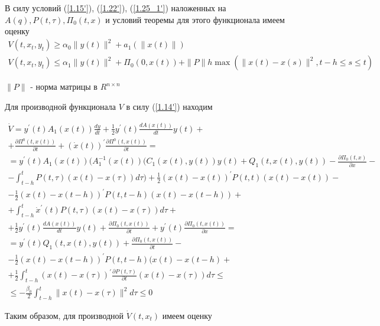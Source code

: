 В силу условий (\ref{1.15'}), (\ref{1.22'}), (\ref{1.25_1'}) наложенных на $A(q), P(t, \tau), \Pi_0(t, x)$ и условий теоремы для этого функционала имеем оценку
$$
\begin{array}{c}
	V(t, x_t, y_t) \ge \alpha_0 \| y(t) \|^2 + a_1 (\| x(t) \|)\\
	V(t, x_t, y_t) \le \alpha_1 \| y(t) \|^2 + \Pi_0 (0, x(t)) + \| P \| h \max (\| x(t) - x(s) \|^2, t-h \le s \le t)
\end{array}
$$

$\| P \|$ - норма матрицы в $R^{n \times n}$

Для производной функционала $V$ в силу (\ref{1.14'}) находим

$$
\begin{array}{c}
\displaystyle \dot V = y^{'} (t) A_1 (x(t)) \frac{dy}{dt} + \frac12 y^{'} (t) \frac{d A(x(t))}{dt} y(t) +\\+
\displaystyle \frac{\partial \Pi^0 (t, x(t))}{\partial t} + (\dot x (t))^{'} \frac{\partial \Pi^0 (t, x(t))}{\partial t} =\\
\displaystyle = y^{'} (t) A_1 (x(t)) ( A_1^{-1} (x(t)) (C_1 (x(t), y(t)) y(t) + Q_1 (t, x(t), y(t)) - \frac{\partial \Pi_0 (t, x)}{\partial x} -\\
\displaystyle - \int_{t - h}^{t} P(t, \tau) (x(t) - x(\tau)) d \tau) + \frac12 (x(t) - x(t))^{'} P(t, t) (x(t) - x(t)) -\\
\displaystyle - \frac12 (x(t) - x(t - h))^{'} P(t, t - h) (x(t) - x(t - h)) +\\
\displaystyle + \int_{t - h}^{t} \dot x^{'} (t) P(t, \tau) (x(t) - x(\tau)) d \tau +\\
\displaystyle + \frac12 y^{'}(t) \frac{d A(x(t))}{dt} y(t) + \frac{\partial \Pi_0 (t, x(t))}{\partial t} + y^{'}(t) \frac{\partial \Pi_0 (t, x(t))}{\partial x} =\\
\displaystyle = y^{'} (t) Q_1 (t, x(t), y(t)) + \frac{\partial \Pi_0 (t, x(t))}{\partial t} -\\
\displaystyle - \frac12 (x(t) - x(t - h))^{'} P (t, t - h) (x(t) - x(t - h) +\\
\displaystyle + \frac12 \int_{t - h}^{t} (x(t) - x(\tau))^{'} \frac{\partial P(t, \tau)}{\partial t} (x(t) - x(\tau)) d \tau \le\\
\displaystyle \le - \frac{\beta_0}{2} \int_{t-h}^{t} \| x(t) - x(\tau) \|^2 d \tau \le 0
\end{array}
$$

Таким образом, для производной $\dot V(t, x_t)$ имеем оценку

